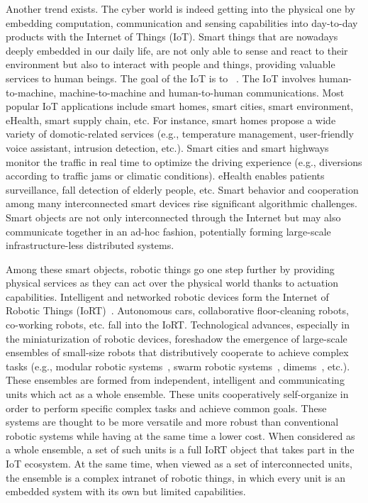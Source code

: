 Another trend exists. The cyber world is indeed getting into the physical one by embedding computation, communication and sensing capabilities into day-to-day products with the Internet of Things (IoT). Smart things that are nowadays deeply embedded in our daily life, are not only able to sense and react to their environment but also to interact with people and things, providing valuable services to human beings. The goal of the IoT is to ~\cite{vermesan2013internet}. The IoT involves human-to-machine, machine-to-machine and human-to-human communications. Most popular IoT applications include smart homes, smart cities, smart environment, eHealth, smart supply chain, etc. For instance, smart homes propose a wide variety of domotic-related services (e.g., temperature management, user-friendly voice assistant, intrusion detection, etc.). Smart cities and smart highways monitor the traffic in real time to optimize the driving experience (e.g., diversions according to traffic jams or climatic conditions). eHealth enables patients surveillance, fall detection of elderly people, etc. Smart behavior and cooperation among many interconnected smart devices rise significant algorithmic challenges. Smart objects are not only interconnected through the Internet but may also communicate together in an ad-hoc fashion, potentially forming large-scale infrastructure-less distributed systems.
 
Among these smart objects, robotic things go one step further by providing physical services as they can act over the physical world thanks to actuation capabilities. Intelligent and networked robotic devices form the Internet of Robotic Things (IoRT)~\cite{vermesan2017internet}. Autonomous cars, collaborative floor-cleaning robots, co-working robots, etc. fall into the IoRT. Technological advances, especially in the miniaturization of robotic devices, foreshadow the emergence of large-scale ensembles of small-size robots that distributively cooperate to achieve complex tasks (e.g., modular robotic systems~\cite{yim2009modular}, swarm robotic systems~\cite{csahin2004swarm}, \gls{dimems}~\cite{bourgeois2012distributed}, etc.). These ensembles are formed from independent, intelligent and communicating units which act as a whole ensemble. These units cooperatively self-organize in order to perform specific complex tasks and achieve common goals. These systems are thought to be more versatile and more robust than conventional robotic systems while having at the same time a lower cost. When considered as a whole ensemble, a set of such units is a full IoRT object that takes part in the IoT ecosystem. At the same time, when viewed as a set of interconnected units, the ensemble is a complex intranet of robotic things, in which every unit is an embedded system with its own but limited capabilities.

